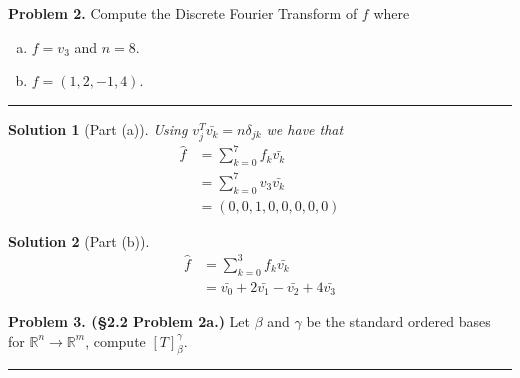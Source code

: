 \documentclass[leqno]{article}
\theoremstyle{nonumberplain}
\newtheorem{solution}{Solution}
\begin{document}
\pagebreak



\noindent\textbf{Problem 2.} Compute the Discrete Fourier Transform of $f$ where 
\begin{enumerate}[(a)]
\item $f=v_3$ and $n=8$.
\item $f=(1,2,-1,4)$.
\end{enumerate}

\noindent\rule[0.5ex]{\linewidth}{1pt}

\begin{solution}[Part (a)]
Using $v_j^T\bar{v_k}=n\delta_{jk}$ we have that 
\begin{align*}
\hat{f}&=\sum_{k=0}^{7}f_k \bar{v_k}\\
&= \sum_{k=0}^{7}v_3 \bar{v_k}\\
&=(0,0,1,0,0,0,0,0)
\end{align*}
\end{solution}

\begin{solution}[Part (b)]
\begin{align*}
\hat{f}&=\sum_{k=0}^{3}f_k \bar{v_k}\\
&= \bar{v_0}+2\bar{v_1}-\bar{v_2}+4\bar{v_3}
\end{align*}
\end{solution}

\pagebreak




\noindent\textbf{Problem 3. (\S 2.2 Problem 2a.)} Let $\beta$ and $\gamma$ be the standard ordered bases for $\mathbb{R}^n \to \mathbb{R}^m$, compute $[T]_\beta^\gamma$.

\noindent\rule[0.5ex]{\linewidth}{1pt}
\end{document}
